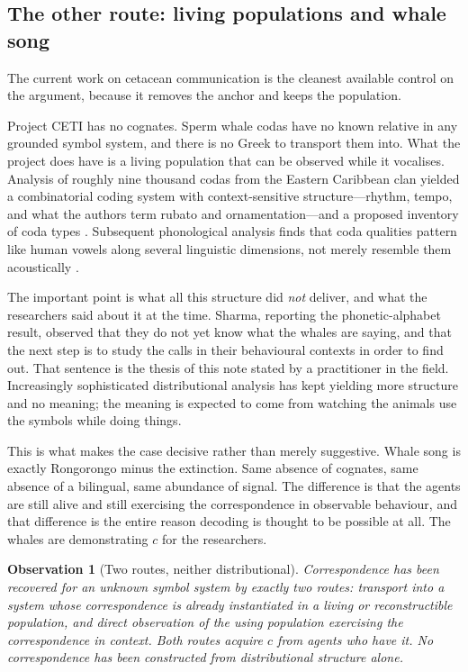 \documentclass[11pt,a4paper]{article}
\theoremstyle{definition}
\theoremstyle{plain}
\newtheorem{observation}[definition]{Observation}
\theoremstyle{remark}
\begin{document}
\subsection{The other route: living populations and whale song}
\label{sec:whales}

The current work on cetacean communication is the cleanest available control on the
argument, because it removes the anchor and keeps the population.

Project CETI has no cognates. Sperm whale codas have no known relative in any grounded
symbol system, and there is no Greek to transport them into. What the project does have is
a living population that can be observed while it vocalises. Analysis of roughly nine
thousand codas from the Eastern Caribbean clan yielded a combinatorial coding system with
context-sensitive structure---rhythm, tempo, and what the authors term rubato and
ornamentation---and a proposed inventory of coda types \cite{sharma2024}. Subsequent
phonological analysis finds that coda qualities pattern like human vowels along several
linguistic dimensions, not merely resemble them acoustically \cite{begus2026}.

The important point is what all this structure did \emph{not} deliver, and what the
researchers said about it at the time. Sharma, reporting the phonetic-alphabet result,
observed that they do not yet know what the whales are saying, and that the next step is
to study the calls in their behavioural contexts in order to find out. That sentence is
the thesis of this note stated by a practitioner in the field. Increasingly sophisticated
distributional analysis has kept yielding more structure and no meaning; the meaning is
expected to come from watching the animals use the symbols while doing things.

This is what makes the case decisive rather than merely suggestive. Whale song is exactly
Rongorongo minus the extinction. Same absence of cognates, same absence of a bilingual,
same abundance of signal. The difference is that the agents are still alive and still
exercising the correspondence in observable behaviour, and that difference is the entire
reason decoding is thought to be possible at all. The whales are demonstrating $c$ for the
researchers.

\begin{observation}[Two routes, neither distributional]
\label{obs:transport}
Correspondence has been recovered for an unknown symbol system by exactly two routes:
transport into a system whose correspondence is already instantiated in a living or
reconstructible population, and direct observation of the using population exercising the
correspondence in context. Both routes acquire $c$ from agents who have it. No
correspondence has been constructed from distributional structure alone.
\end{observation}
\end{document}
